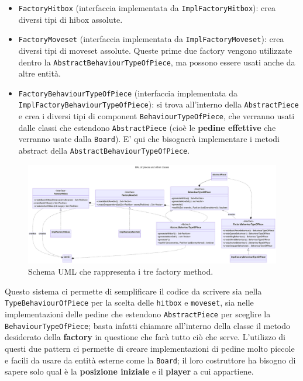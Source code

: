 \documentclass[a4paper,12pt]{report}
\begin{document}
\begin{itemize} 
\item \texttt{FactoryHitbox} (interfaccia implementata da \texttt{ImplFactoryHitbox}): crea diversi tipi di hibox assolute.
\item \texttt{FactoryMoveset} (interfaccia implementata da \texttt{ImplFactoryMoveset}): crea diversi tipi di moveset assolute.
Queste prime due factory vengono utilizzate dentro la \texttt{AbstractBehaviourTypeOfPiece}, ma possono essere usati anche da altre entità.
\item \texttt{FactoryBehaviourTypeOfPiece} (interfaccia implementata da \texttt{ImplFactoryBehaviourTypeOfPiece}): si trova all'interno della \texttt{AbstractPiece} e
crea i diversi tipi di component \texttt{BehaviourTypeOfPiece}, che verranno usati dalle classi che estendono \texttt{AbstractPiece} (cioè le \textbf{pedine effettive} che verranno usate dalla \texttt{Board}). E' qui che bisognerà 
implementare i metodi abstract della \texttt{AbstractBehaviourTypeOfPiece}.
\end{itemize}
\begin{figure}[H]
\centering
\includegraphics[width=\textwidth]{images/factory-pattern.png}
\caption{Schema UML che rappresenta i tre factory method.}
\label{images:factory-pattern}
\end{figure}
Questo sistema ci permette di semplificare il codice da scrivere sia nella \texttt{TypeBehaviourOfPiece} per la scelta delle \texttt{hitbox} e \texttt{moveset}, sia nelle implementazioni delle pedine che estendono \texttt{AbstractPiece}
per sceglire la \texttt{BehaviourTypeOfPiece}; basta infatti chiamare all'interno della classe il metodo desiderato della \textbf{factory} in questione che farà tutto ciò che serve.
L'utilizzo di questi due pattern ci permette di creare implementazioni di pedine molto piccole e facili da usare da entità esterne come la \texttt{Board}; il loro costruttore ha bisogno di sapere solo qual è la \textbf{posizione iniziale} e il \textbf{player} a cui appartiene.
\end{document}
